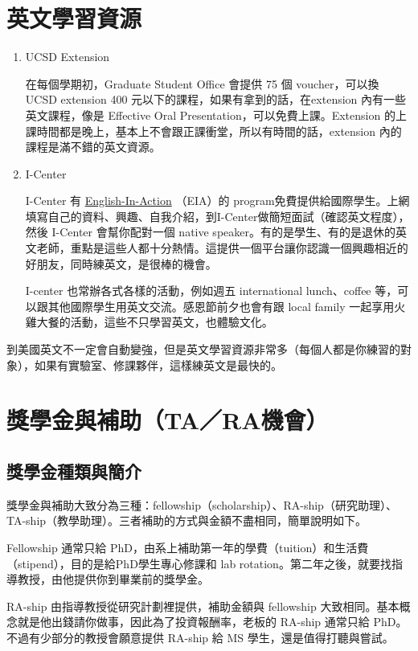 \documentclass[10pt,a4paper]{book}
\begin{document}
\begin{CJK}{UTF8}{bkai}
\section{英文學習資源}
\begin{enumerate}
\item UCSD Extension %

在每個學期初，Graduate Student Office 會提供 75 個 voucher，可以換 UCSD extension 400 元以下的課程，如果有拿到的話，在extension 內有一些英文課程，像是 Effective Oral Presentation，可以免費上課。Extension 的上課時間都是晚上，基本上不會跟正課衝堂，所以有時間的話，extension 內的課程是滿不錯的英文資源。

\item I-Center %

I-Center 有 \href{http://ispo.ucsd.edu/programs-events/eia/tutee-application.html}{English-In-Action} （EIA）的 program免費提供給國際學生。上網填寫自己的資料、興趣、自我介紹，到I-Center做簡短面試（確認英文程度），然後 I-Center 會幫你配對一個 native speaker。有的是學生、有的是退休的英文老師，重點是這些人都十分熱情。這提供一個平台讓你認識一個興趣相近的好朋友，同時練英文，是很棒的機會。

I-center 也常辦各式各樣的活動，例如週五 international lunch、coffee 等，可以跟其他國際學生用英文交流。感恩節前夕也會有跟 local family 一起享用火雞大餐的活動，這些不只學習英文，也體驗文化。
\end{enumerate}

到美國英文不一定會自動變強，但是英文學習資源非常多（每個人都是你練習的對象），如果有實驗室、修課夥伴，這樣練英文是最快的。

\section{獎學金與補助（TA／RA機會）}

\subsection{獎學金種類與簡介}
獎學金與補助大致分為三種：fellowship（scholarship）、RA-ship（研究助理）、TA-ship（教學助理）。三者補助的方式與金額不盡相同，簡單說明如下。

Fellowship 通常只給 PhD，由系上補助第一年的學費（tuition）和生活費（stipend），目的是給PhD學生專心修課和 lab rotation。第二年之後，就要找指導教授，由他提供你到畢業前的獎學金。

RA-ship 由指導教授從研究計劃裡提供，補助金額與 fellowship 大致相同。基本概念就是他出錢請你做事，因此為了投資報酬率，老板的 RA-ship 通常只給 PhD。不過有少部分的教授會願意提供 RA-ship 給 MS 學生，還是值得打聽與嘗試。


\end{CJK}
\end{document}
